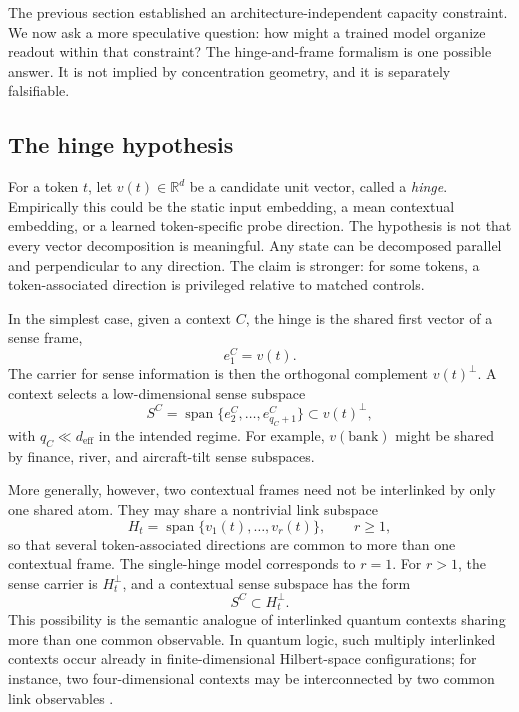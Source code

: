 \documentclass[
  aps,
  reprint,
  superscriptaddress,
  floatfix,
  nofootinbib,
  longbibliography
]{revtex4-2}
\newcommand{\R}{\mathbb{R}}
\newcommand{\deff}{d_{\mathrm{eff}}}
\DeclareMathOperator{\spanop}{span}
\begin{document}
The previous section established an architecture-independent capacity
constraint. We now ask a more speculative question: how might a trained
model organize readout within that constraint? The hinge-and-frame
formalism is one possible answer. It is not implied by concentration
geometry, and it is separately falsifiable.

\subsection{The hinge hypothesis}
\label{sec:hingeform}

For a token $t$, let $v(t)\in\R^d$ be a candidate unit vector, called
a \emph{hinge}. Empirically this could be the static input embedding,
a mean contextual embedding, or a learned token-specific probe
direction. The hypothesis is not that every vector decomposition is
meaningful. Any state can be decomposed parallel and perpendicular to
any direction. The claim is stronger: for some tokens, a
token-associated direction is privileged relative to matched controls.

In the simplest case, given a context $C$, the hinge is the shared
first vector of a sense frame,
%
\begin{equation}
\label{eq:hinge-first}
e_1^C=v(t).
\end{equation}
%
The carrier for sense information is then the orthogonal complement
$v(t)^\perp$. A context selects a low-dimensional sense subspace
%
\begin{equation}
\label{eq:sense-subspace}
S^C=\spanop\{e_2^C,\dots,e_{q_C+1}^C\}
\subset v(t)^\perp ,
\end{equation}
%
with $q_C\ll\deff$ in the intended regime. For example,
$v(\text{bank})$ might be shared by finance, river, and aircraft-tilt
sense subspaces.

More generally, however, two contextual frames need not be interlinked
by only one shared atom. They may share a nontrivial link subspace
%
\begin{equation}
\label{eq:multi-hinge}
H_t=\spanop\{v_1(t),\dots,v_r(t)\},
\qquad r\ge 1 ,
\end{equation}
%
so that several token-associated directions are common to more than
one contextual frame. The single-hinge model corresponds to $r=1$.
For $r>1$, the sense carrier is $H_t^\perp$, and a contextual sense
subspace has the form
%
\begin{equation}
\label{eq:multi-sense-subspace}
S^C\subset H_t^\perp .
\end{equation}
%
This possibility is the semantic analogue of interlinked quantum
contexts sharing more than one common observable. In quantum logic,
such multiply interlinked contexts occur already in finite-dimensional
Hilbert-space configurations; for instance, two four-dimensional
contexts may be interconnected by two common link observables
\cite{svozil:040102}.
\end{document}
